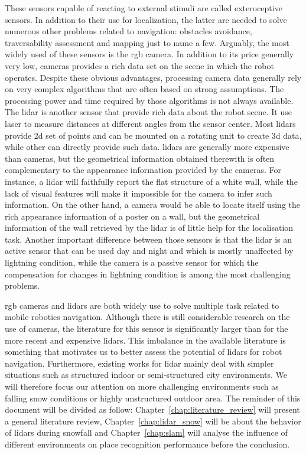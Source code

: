 These sensors capable of reacting to external stimuli are called exteroceptive sensors. In addition to their use for localization, the latter are needed to solve numerous other problems related to navigation: obstacles avoidance, traversability assessment and mapping just to name a few. Arguably, the most widely used of these sensors is the \gls*{rgb} camera. In addition to its price generally very low, cameras provides a rich data set on the scene in which the robot operates. Despite these obvious advantages, processing camera data generally rely on very complex algorithms that are often based on strong assumptions. The processing power and time required by those algorithms is not always available. The \gls*{lidar} is another sensor that provide rich data about the robot scene. It use laser to measure distances at different angles from the sensor center. Most \gls*{lidar}s provide \gls*{2d} set of points and can be mounted on a rotating unit to create \gls*{3d} data, while other can directly provide such data. \gls*{lidar}s are generally more expensive than cameras, but the geometrical information obtained therewith is often complementary to the appearance information provided by the cameras. For instance, a \gls*{lidar} will faithfully report the flat structure of a white wall, while the lack of visual features will make it impossible for the camera to infer such information. On the other hand, a camera would be able to locate itself using the rich appearance information of a poster on a wall, but the geometrical information of the wall retrieved by the \gls*{lidar} is of little help for the localisation task. Another important difference between those sensors is that the \gls*{lidar} is an active sensor that can be used day and night and which is mostly unaffected by lightning condition, while the camera is a passive sensor for which the compensation for changes in lightning condition is among the most challenging problems.

\gls*{rgb} cameras and \gls*{lidar}s are both widely use to solve multiple task related to mobile robotics navigation. Although there is still considerable research on the use of cameras, the literature for this sensor is significantly larger than for the more recent and expensive \gls*{lidar}s. This imbalance in the available literature is something that motivates us to better assess the potential of \gls*{lidar}s for robot navigation.  Furthermore, existing works for \gls*{lidar} mainly deal with simpler situations such as structured indoor or semi-structured city environments. We will therefore focus our attention on more challenging environments such as falling snow conditions or highly unstructured outdoor area. The reminder of this document will be divided as follow: Chapter~\ref{chap:literature_review} will present a general literature review, Chapter~\ref{chap:lidar_snow} will be about the behavior of \gls*{lidar}s during snowfall and Chapter~\ref{chap:slam} will analyse the influence of different environments on place recognition performance before the conclusion.
